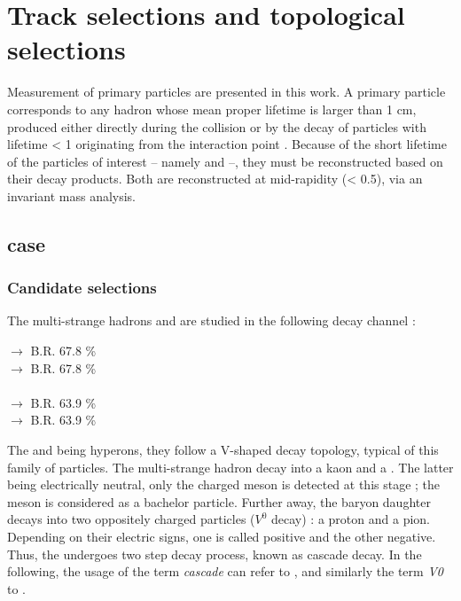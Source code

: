 \newpage
\section{Track selections and topological selections}
\label{sec:Section04}


Measurement of primary particles are presented in this work. A primary particle corresponds to any hadron whose mean proper lifetime is larger than 1 cm, produced either directly during the collision or by the decay of particles with lifetime \cTau < 1 \cm originating from the interaction point \cite{noauthor_alice_2017}. Because of the short lifetime of the particles of interest -- namely \rmOmega and \rmPhiMes --, they must be reconstructed based on their decay products. Both are reconstructed at mid-rapidity (\absrap < 0.5), via an invariant mass analysis.

\subsection{\rmOmega case}
\label{sec:Section04.a-}

\subsubsection{Candidate selections}

The multi-strange hadrons \rmOmegaM and \rmAomegaP are studied in the following decay channel :

\rmOmegaM [$sss$] $\rightarrow$ \rmLambda [$u d s$] \Kminus [$\bar{d} s$]  \qquad \textsc{B.R. 67.8 \%}\\
 $\rightarrow$  \Kplus [$u\bar{s}$] \qquad \textsc{B.R. 67.8 \%} \\
\\
\rmLambda [$u d s$] $\rightarrow$ \proton [$uud$] \piMinus [$\bar{u} d$] \qquad \textsc{B.R. 63.9 \%}\\
 $\rightarrow$  \piPlus [$u \bar{d}$] \qquad \textsc{B.R. 63.9 \%}

The \rmLambda and \rmOmega being hyperons, they follow a V-shaped decay topology, typical of this family of particles. The multi-strange hadron decay into a kaon and a \rmLambda. The latter being electrically neutral, only the charged meson is detected at this stage ; the meson is considered as a bachelor particle. Further away, the baryon daughter decays into two oppositely charged particles ($V^0$ decay) : a proton and a pion. Depending on their electric signs, one is called positive and the other negative. Thus, the \rmOmega undergoes two step decay process, known as cascade decay. In the following, the usage of the term \textit{cascade} can refer to \rmOmega, and similarly the term \textit{V0} to \rmLambda.

